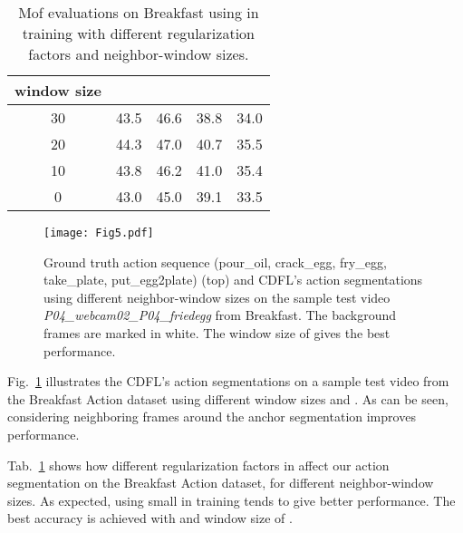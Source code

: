 \documentclass[10pt,twocolumn,letterpaper]{article}
\begin{document}
\begin{table}[t]
\begin{center}
\begin{tabular}{|c|c|c|c|c|}
\hline  window size &  &  &  & \\
\hline 30 & 43.5& 46.6 & 38.8 & 34.0\\
\hline 20 & 44.3& 47.0 & 40.7 & 35.5\\
\hline 10 & 43.8& 46.2 & 41.0 & 35.4\\
\hline 0 & 43.0& 45.0 & 39.1 & 33.5\\
\hline
\end{tabular}
\end{center}
\caption{Mof evaluations on Breakfast using  in training with different regularization factors and neighbor-window sizes.}
\label{table:Different regularization}
\end{table}


\begin{figure}
\centering
\texttt{[image: Fig5.pdf]}
\caption{Ground truth action sequence (\textcolor{mygold}{pour\_oil}, \textcolor{mymaroon}{crack\_egg}, \textcolor{mygreen}{fry\_egg}, \textcolor{myviolet}{take\_plate}, \textcolor{myaquamarine}{put\_egg2plate}) (top) and CDFL's action segmentations using different neighbor-window sizes on the sample test video \textit{P04\_webcam02\_P04\_friedegg} from Breakfast. The background frames are marked in white. The window size of  gives the best performance.}
\label{fig:diff_win}
\end{figure}

Fig.~\ref{fig:diff_win} illustrates the CDFL's action segmentations on a sample test video from the Breakfast Action dataset using different window sizes and . As can be seen, considering neighboring frames around the anchor segmentation improves performance. 

Tab.~\ref{table:Different regularization} shows how different regularization factors   in  affect our action segmentation on the Breakfast Action dataset, for different neighbor-window sizes. As expected, using small  in training tends to give better performance. The best accuracy is achieved with  and window size of .
\end{document}
